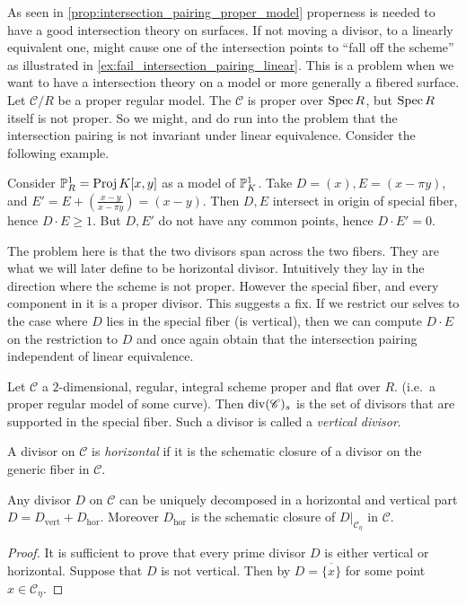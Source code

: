 
As seen in \cref{prop:intersection_pairing_proper_model} properness is needed to have a good intersection theory on surfaces. 
If not moving a divisor, to a linearly equivalent one, might cause one of the intersection points to ``fall off the scheme'' as illustrated in \cref{ex:fail_intersection_pairing_linear}.
This is a problem when we want to have a intersection theory on a model or more generally a fibered surface. 
Let $\mathscr C  / R $ be a proper regular model. 
The $\mathscr C$ is proper over $\operatorname{Spec} R$, but $\operatorname{Spec} R$ itself is not proper. 
So we might, and do run into the problem that the intersection pairing is not invariant under linear equivalence. Consider the following example.

\begin{example}\label{ex:first_model}
	Consider $\mathbb{P}^{1}_R = \operatorname{Proj} K[x, y]$ as a model of $\mathbb{P}^{1}_K$. 
	Take $D = (x), E = (x-\pi y )$, and $E' = E + (\frac{x-y}{x-\pi y})= (x - y)$.
	Then  $D, E$ intersect in origin of special fiber, hence $D\cdot E \ge 1$. 
	But $D, E'$ do not have any common points, hence $D \cdot E' = 0$. 
\end{example}

The problem here is that the two divisors span across the two fibers.
They are what we will later define to be horizontal divisor. 
Intuitively they lay in the direction where the scheme is not proper. 
However the special fiber, and every component in it is a proper divisor. 
This suggests a fix.
If we restrict our selves to the case where $D$ lies in the special fiber (is vertical), then we can compute $D\cdot E$ on the restriction to $D$ and once again obtain that the intersection pairing independent of linear equivalence. 

\begin{definition}\label{def:vertical_divisor}
	Let $\mathscr{C}$ a $2$-dimensional, regular, integral scheme proper and flat over $R$.  (i.e.\ a proper regular model of some curve). 
	Then $\operatorname{div}(\mathscr{C})_s$ is the set of divisors that are supported in the special fiber. 
	Such a divisor is called a \emph{vertical divisor}.
\end{definition}
\begin{definition}\label{def:horizontal_divisor}
	A divisor on $\mathscr{C} $ is \emph{horizontal} if it is the schematic closure of a divisor on the generic fiber in $\mathscr C$. 
\end{definition}
\begin{lemma}\label{lem:decomponsition_horizontal_vertical}
	Any divisor $D$ on $\mathscr{C}$ can be uniquely decomposed in a horizontal and vertical part $D =  D_\text{vert}  + D_\text{hor}$. 
	Moreover $D_\text{hor} $ is the schematic closure of $D|_{\mathscr C_\eta}$ in $\mathscr C$.
\end{lemma}
\begin{proof}
	It is sufficient to prove that every prime divisor $D$ is either vertical or horizontal.
	Suppose that $D$ is not vertical. 
	Then by \cite[prop. 8.3.4]{liuAlgebraicGeometryArithmetic2002} $D = \overline{\{x\} }$ for some point $x \in \mathscr{C} _\eta$.
\end{proof}

